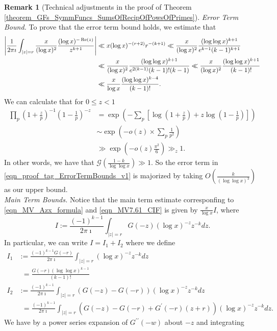 \documentclass[11pt,reqno,a4letter]{article}
\numberwithin{figure}{section}
\numberwithin{table}{section}
\theoremstyle{plain}
\numberwithin{theorem}{section}
\theoremstyle{definition}
\newtheorem{remark}[theorem]{Remark}
\renewcommand{\Re}{\operatorname{Re}}
\begin{document}
\begin{remark}[Technical adjustments in the proof of Theorem \ref{theorem_GFs_SymmFuncs_SumsOfRecipOfPowsOfPrimes}]
\textit{Error Term Bound.} 
To prove that the error term bound holds, we estimate that 
\begin{align} 
\notag 
\left\lvert \frac{1}{2\pi\imath} \int_{|z|=r} 
     \frac{x}{(\log x)^2} \frac{(\log x)^{-\Re(z)}}{z^{k+1}} \right\rvert & \ll 
     x (\log x)^{-(r+2)} r^{-(k+1)} 
     \ll \frac{x}{(\log x)^2} \frac{(\log\log x)^{k+1}}{e^{k-1} (k-1)^{k+1}} \\ 
\notag 
     & \ll \frac{x}{(\log x)^2} \frac{(\log\log x)^{k+1}}{e^{2(k-1)} (k-1)! (k-1)} 
     \ll \frac{x}{(\log x)^{2}} \frac{(\log\log x)^{k+1}}{(k-1)!} \\ 
\label{eqn_proof_tag_ErrorTermBounds_v1} 
     & \ll \frac{x}{\log x} \frac{(\log\log x)^{k-4}}{(k-1)!}. 
\end{align} 
We can calculate that for $0 \leq z < 1$ 
\begin{align*} 
\prod_p \left(1 + \frac{z}{p}\right)^{-1} \left(1 - \frac{1}{p}\right)^{-z} & = 
     \exp\left(-\sum_p \left[\log\left(1 + \frac{z}{p}\right) + z 
     \log\left(1 - \frac{1}{p}\right) \right]\right) \\ 
     & \sim \exp\left(-o(z) \times \sum_p \frac{1}{p^2}\right) \\ 
     & \gg \exp\left(-o(z) \frac{\pi^2}{6}\right) \gg_z 1. 
\end{align*} 
In other words, we have that 
$\mathcal{G}\left(\frac{1-k}{\log\log x}\right) \gg 1$. 
So the error term in \eqref{eqn_proof_tag_ErrorTermBounds_v1} 
is majorized by taking $O\left(\frac{k}{(\log\log x)^3}\right)$ as our 
upper bound. \\ 
\textit{Main Term Bounds.} 
Notice that the main term 
estimate corresponfing to \eqref{eqn_MV_Azx_formula} and \eqref{eqn_MV7.61_CIF} 
is given by $\frac{x}{\log x} I$, where 
\[
I := \frac{(-1)^{k-1}}{2\pi\imath} \int_{|z|=r} G(-z) (\log x)^{-z} z^{-k} dz. 
\]
In particular, we can write $I = I_1 + I_2$ where we define 
\begin{align*} 
I_1 & := \frac{(-1)^{k-1} G(-r)}{2\pi\imath} \int_{|z|=r} (\log x)^{-z} z^{-k} dz \\ 
    & \phantom{:}= \frac{G(-r) (\log\log x)^{k-1}}{(k-1)!} \\ 
I_2 & := \frac{(-1)^{k-1}}{2\pi\imath} \int_{|z|=r} (G(-z) - G(-r)) (\log x)^{-z} z^{-k} dz \\ 
    & \phantom{:}= \frac{(-1)^{k-1}}{2\pi\imath} \int_{|z|=r} (G(-z) - G(-r) + G^{\prime}(-r) (z+r)) 
    (\log x)^{-z} z^{-k} dz. 
\end{align*} 
We have by a power series expansion of $G^{\prime\prime}(-w)$ about $-z$ and integrating 

\end{remark}
\end{document}
